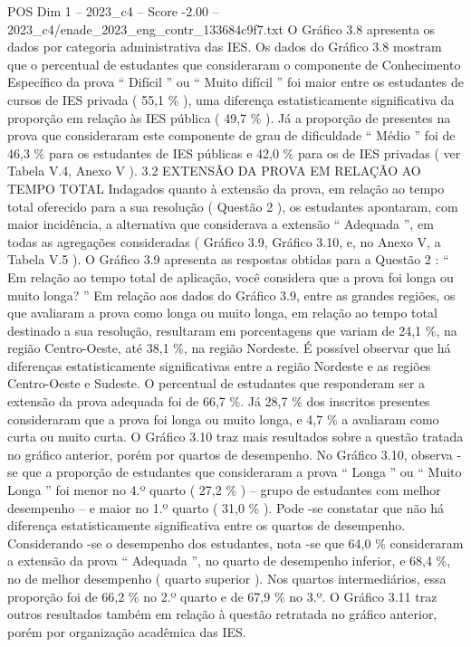 \begin{textsample}{POS Dim 1 – 2023\_c4 – Score -2.00 – 2023\_c4/enade\_2023\_eng\_contr\_133684c9f7.txt}
O Gráfico 3.8 apresenta os dados por categoria administrativa das IES.
Os dados do Gráfico 3.8 mostram que o percentual de estudantes que consideraram o componente de Conhecimento Específico da prova “ Difícil ” ou “ Muito difícil ” foi maior entre os estudantes de cursos de IES privada ( 55,1 \% ), uma diferença estatisticamente significativa da proporção em relação às IES pública ( 49,7 \% ).
Já a proporção de presentes na prova que consideraram este componente de grau de dificuldade “ Médio ” foi de 46,3 \% para os estudantes de IES públicas e 42,0 \% para os de IES privadas ( ver Tabela V.4, Anexo V ). 3.2 EXTENSÃO DA PROVA EM RELAÇÃO AO TEMPO TOTAL Indagados quanto à extensão da prova, em relação ao tempo total oferecido para a sua resolução ( Questão 2 ), os estudantes apontaram, com maior incidência, a alternativa que considerava a extensão “ Adequada ”, em todas as agregações consideradas ( Gráfico 3.9, Gráfico 3.10, e, no Anexo V, a Tabela V.5 ).
O Gráfico 3.9 apresenta as respostas obtidas para a Questão 2 : “ Em relação ao tempo total de aplicação, você considera que a prova foi longa ou muito longa? ” Em relação aos dados do Gráfico 3.9, entre as grandes regiões, os que avaliaram a prova como longa ou muito longa, em relação ao tempo total destinado a sua resolução, resultaram em porcentagens que variam de 24,1 \%, na região Centro-Oeste, até 38,1 \%, na região Nordeste.
É possível observar que há diferenças estatisticamente significativas entre a região Nordeste e as regiões Centro-Oeste e Sudeste.
O percentual de estudantes que responderam ser a extensão da prova adequada foi de 66,7 \%.
Já 28,7 \% dos inscritos presentes consideraram que a prova foi longa ou muito longa, e 4,7 \% a avaliaram como curta ou muito curta.
O Gráfico 3.10 traz mais resultados sobre a questão tratada no gráfico anterior, porém por quartos de desempenho.
No Gráfico 3.10, observa -se que a proporção de estudantes que consideraram a prova “ Longa ” ou “ Muito Longa ” foi menor no 4.º quarto ( 27,2 \% ) – grupo de estudantes com melhor desempenho – e maior no 1.º quarto ( 31,0 \% ).
Pode -se constatar que não há diferença estatisticamente significativa entre os quartos de desempenho.
Considerando -se o desempenho dos estudantes, nota -se que 64,0 \% consideraram a extensão da prova “ Adequada ”, no quarto de desempenho inferior, e 68,4 \%, no de melhor desempenho ( quarto superior ).
Nos quartos intermediários, essa proporção foi de 66,2 \% no 2.º quarto e de 67,9 \% no 3.º.
O Gráfico 3.11 traz outros resultados também em relação à questão retratada no gráfico anterior, porém por organização acadêmica das IES.

\end{textsample}
